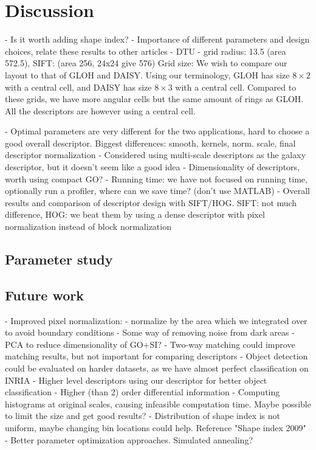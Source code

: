 \documentclass[thesis.tex]{subfiles}
\begin{document}
\chapter{Discussion}

- Is it worth adding shape index?
- Importance of different parameters and design choices, relate these results to other articles
	- DTU
		- grid radius: 13.5 (area 572.5), SIFT: (area 256, 24x24 give 576)
		Grid size:
		We wish to compare our layout to that of GLOH and DAISY. Using our terminology, GLOH has size $8\times2$ with a central cell, and DAISY has size $8 \times 3$ with a central cell. Compared to these grids, we have more angular cells but the same amount of rings as GLOH. All the descriptors are however using a central cell.
		
		
		
- Optimal parameters are very different for the two applications, hard to choose a good overall descriptor. Biggest differences: smooth, kernels, norm. scale, final descriptor normalization
- Considered using multi-scale descriptors as the galaxy descriptor, but it doesn't seem like a good idea
- Dimensionality of descriptors, worth using compact GO?
- Running time: we have not focused on running time, optionally run a profiler, where can we save time? (don't use MATLAB)
- Overall results and comparison of descriptor design with SIFT/HOG. SIFT: not much difference, HOG: we beat them by using a dense descriptor with pixel normalization instead of block normalization

\section{Parameter study}


\section{Future work} %
- Improved pixel normalization:
	- normalize by the area which we integrated over to avoid boundary conditions
	- Some way of removing noise from dark areas
- PCA to reduce dimensionality of GO+SI?
- Two-way matching could improve matching results, but not important for comparing descriptors
- Object detection could be evaluated on harder datasets, as we have almost perfect classification on INRIA
- Higher level descriptors using our descriptor for better object classification
- Higher (than 2) order differential information
- Computing histograms at original scales, causing infeasible computation time. Maybe possible to limit the size and get good results?
- Distribution of shape index is not uniform, maybe changing bin locations could help. Reference "Shape index 2009"
- Better parameter optimization approaches. Simulated annealing?
\end{document}
